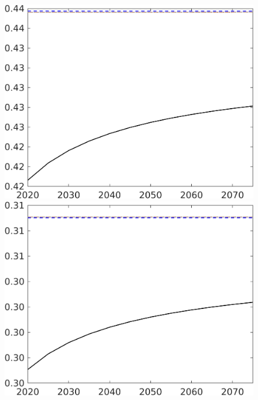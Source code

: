 \begin{figure}[h!!]
\begin{minipage}[]{0.32\textwidth}
\includegraphics[width=1\textwidth]{../../codding_model/own_basedOnFried/optimalPol_010922_revision/figures/all_5Sept22/CompRed_TaulCalib_hh_spillover0_nsk0_xgr0_sep1_LFlimit0_emsbase0_countec0_GovRev1_etaa0.79_lgd0.png}
\end{minipage}
\begin{minipage}[]{0.32\textwidth}
\includegraphics[width=1\textwidth]{../../codding_model/own_basedOnFried/optimalPol_010922_revision/figures/all_5Sept22/CompRed_TaulCalib_hl_spillover0_nsk0_xgr0_sep1_LFlimit0_emsbase0_countec0_GovRev1_etaa0.79_lgd0.png}
\end{minipage}

\end{figure}
